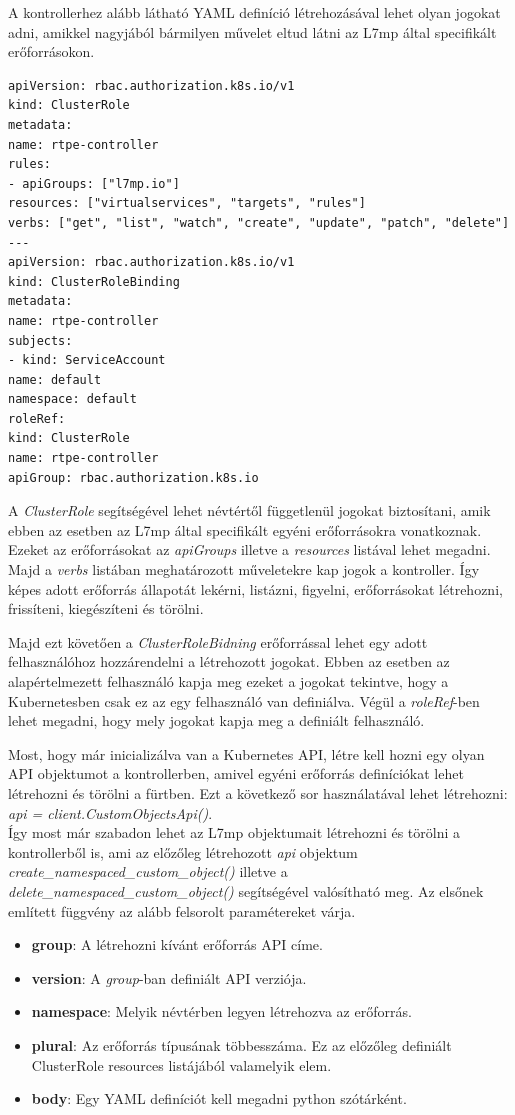 A kontrollerhez alább látható YAML definíció létrehozásával lehet olyan jogokat
adni, amikkel nagyjából bármilyen művelet eltud látni az L7mp által specifikált 
erőforrásokon.

\begin{lstlisting}[caption=RBAC létrehozása, label=lst:rbac]
apiVersion: rbac.authorization.k8s.io/v1
kind: ClusterRole
metadata:
name: rtpe-controller
rules:
- apiGroups: ["l7mp.io"]
resources: ["virtualservices", "targets", "rules"]
verbs: ["get", "list", "watch", "create", "update", "patch", "delete"]
---
apiVersion: rbac.authorization.k8s.io/v1
kind: ClusterRoleBinding
metadata:
name: rtpe-controller
subjects:
- kind: ServiceAccount
name: default
namespace: default
roleRef:
kind: ClusterRole
name: rtpe-controller
apiGroup: rbac.authorization.k8s.io
\end{lstlisting}

A \textit{ClusterRole} segítségével lehet névtértől függetlenül jogokat biztosítani,
amik ebben az esetben az L7mp által specifikált egyéni erőforrásokra vonatkoznak. 
Ezeket az erőforrásokat az \textit{apiGroups} illetve a \textit{resources} listával
lehet megadni. Majd a \textit{verbs} listában meghatározott műveletekre kap 
jogok a kontroller. Így képes adott erőforrás állapotát lekérni, listázni, figyelni,
erőforrásokat létrehozni, frissíteni, kiegészíteni és törölni. 

Majd ezt követően a \textit{ClusterRoleBidning} erőforrással lehet egy adott
felhasználóhoz hozzárendelni a létrehozott jogokat. Ebben az esetben az alapértelmezett
felhasználó kapja meg ezeket a jogokat tekintve, hogy a Kubernetesben csak ez az egy
felhasználó van definiálva. Végül a \textit{roleRef}-ben lehet megadni, hogy mely
jogokat kapja meg a definiált felhasználó. 

Most, hogy már inicializálva van a Kubernetes API, létre kell hozni egy olyan 
API objektumot a kontrollerben, amivel egyéni erőforrás definíciókat lehet létrehozni
és törölni a fürtben. Ezt a következő sor használatával lehet létrehozni: 
\textit{api = client.CustomObjectsApi()}. \\

Így most már szabadon lehet az L7mp objektumait létrehozni és törölni a kontrollerből is, 
ami az előzőleg létrehozott \textit{api} objektum \textit{create\_namespaced\_custom\_object()}
illetve a \textit{delete\_namespaced\_custom\_object()} segítségével valósítható meg. Az elsőnek
említett függvény az alább felsorolt paramétereket várja.

\begin{itemize}
	\item \textbf{group}: A létrehozni kívánt erőforrás API címe.  
	\item \textbf{version}: A \textit{group}-ban definiált API verziója. 
	\item \textbf{namespace}: Melyik névtérben legyen létrehozva az erőforrás.
	\item \textbf{plural}: Az erőforrás típusának többesszáma. Ez az előzőleg definiált
	ClusterRole resources listájából valamelyik elem. 
	\item \textbf{body}: Egy YAML definíciót kell megadni python szótárként. 
\end{itemize}

